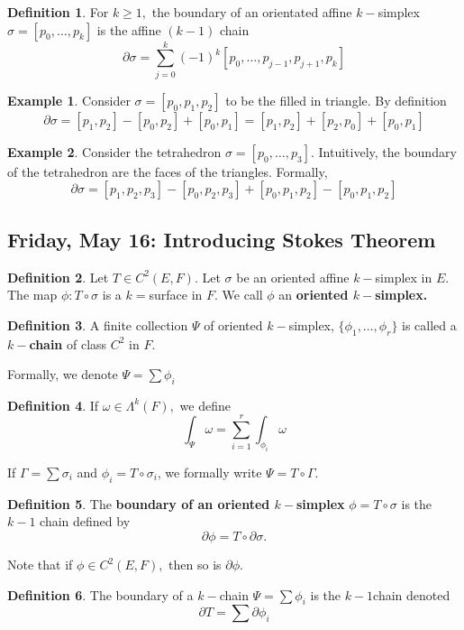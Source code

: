 \documentclass[10pt, oneside]{article}
\theoremstyle{definition}
\newtheorem{exmp}{Example}[section]
\newtheorem{defn}{Definition}
\begin{document}
\begin{defn}
    For $k \geq 1,$ the boundary of an orientated affine $k-$simplex  $\sigma = [p_0, \dots, p_k]$ is the affine $(k-1)$ chain
    \[\partial \sigma = \sum_{j=0}^k (-1)^k [p_0, \dots, p_{j-1}, p_{j+1}, p_k]\]
\end{defn}
\begin{exmp}
    Consider $\sigma = [p_0, p_1, p_2]$ to be the filled in triangle. By definition
    \[\partial \sigma = [p_1, p_2] - [p_0, p_2] + [p_0, p_1] = [p_1, p_2] + [p_2, p_0] + [p_0, p_1]\]
\end{exmp}
\begin{exmp}
    Consider the tetrahedron $\sigma = [p_0, \dots, p_3].$ Intuitively, the boundary of the tetrahedron are the faces of the triangles. Formally, 
    \[\partial \sigma = [p_1, p_2, p_3] - [p_0, p_2, p_3] + [p_0, p_1, p_2] - [p_0, p_1, p_2]\]
\end{exmp}


\newpage
\subsection{Friday, May 16: Introducing Stokes Theorem}
\begin{defn}
    Let $T \in C^2(E, F).$ Let $\sigma$ be an oriented affine $k-$simplex in $E.$ The map $\phi: T\circ \sigma$ is a $k=$surface in $F.$ We call $\phi$ an \textbf{oriented $k-$simplex.}
\end{defn}
\begin{defn}
    A finite collection $\Psi$ of oriented $k-$simplex, $\{\phi_1, \dots, \phi_r\}$ is called a \textbf{$k-$chain} of class $C^2$ in $F.$ 
\end{defn}
Formally, we denote $\Psi = \sum \phi_i$
\begin{defn}
    If $\omega \in \Lambda^k(F),$ we define 
    \[\int_\Psi \omega = \sum_{i=1}^r \int_{\phi_i}\omega\]
\end{defn}

If $\Gamma = \sum \sigma_i$ and $\phi_i = T \circ \sigma_i$, we formally write $\Psi = T \circ \Gamma.$

\begin{defn}
    The \textbf{boundary of an oriented $k-$simplex} $\phi = T\circ \sigma$ is the $k-1$ chain defined by
    \[\partial \phi = T\circ \partial \sigma.\]
\end{defn}
Note that if $\phi \in C^2(E,F),$ then so is $\partial \phi.$ 
\begin{defn}
    The {boundary of a $k-$chain }$\Psi = \sum \phi_i$ is the $k-1$chain denoted 
    \[\partial T = \sum \partial \phi_i\]
\end{defn}
\end{document}
